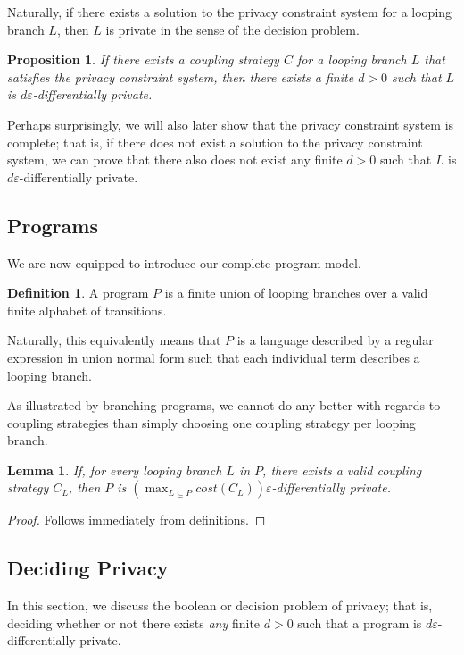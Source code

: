 \documentclass[12pt]{article}
\newtheorem{lemma}[thm]{Lemma}
\newtheorem{prop}[thm]{Proposition}
\theoremstyle{definition}
\newtheorem{defn}[thm]{Definition}
\begin{document}
Naturally, if there exists a solution to the privacy constraint system for a looping branch $L$, then $L$ is private in the sense of the decision problem. 

\begin{prop}\label{privacyFiniteCostProp}
    If there exists a coupling strategy $C$ for a looping branch $L$ that satisfies the privacy constraint system, then there exists a finite $d>0$ such that $L$ is $d\varepsilon$-differentially private. 
\end{prop}

Perhaps surprisingly, we will also later show that the privacy constraint system is complete; that is, if there does not exist a solution to the privacy constraint system, we can prove that there also does not exist any finite $d>0$ such that $L$ is $d\varepsilon$-differentially private. 

\subsection{Programs}

We are now equipped to introduce our complete program model. 

\begin{defn}
    A program $P$ is a finite union of looping branches over a valid finite alphabet of transitions. 
\end{defn}

Naturally, this equivalently means that $P$ is a language described by a regular expression in union normal form such that each individual term describes a looping branch. 

As illustrated by branching programs, we cannot do any better with regards to coupling strategies than simply choosing one coupling strategy per looping branch. 

\begin{lemma}
    If, for every looping branch $L$ in $P$, there exists a valid coupling strategy $C_L$, then $P$ is $(\max_{L\subseteq P} cost(C_L))\varepsilon$-differentially private. 
\end{lemma}
\begin{proof}
    Follows immediately from definitions. 
\end{proof}

\subsection{Deciding Privacy}

In this section, we discuss the boolean or decision problem of privacy; that is, deciding whether or not there exists \textit{any} finite $d>0$ such that a program is $d\varepsilon$-differentially private. 
\end{document}
